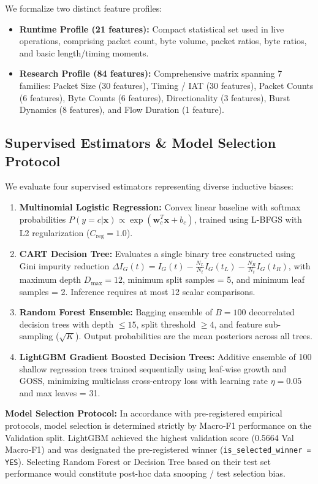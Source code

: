\documentclass[conference]{IEEEtran}
\begin{document}
We formalize two distinct feature profiles:
\begin{itemize}
    \item \textbf{Runtime Profile (21 features):} Compact statistical set used in live operations, comprising packet count, byte volume, packet ratios, byte ratios, and basic length/timing moments.
    \item \textbf{Research Profile (84 features):} Comprehensive matrix spanning 7 families: Packet Size (30 features), Timing / IAT (30 features), Packet Counts (6 features), Byte Counts (6 features), Directionality (3 features), Burst Dynamics (8 features), and Flow Duration (1 feature).
\end{itemize}

\subsection{Supervised Estimators \& Model Selection Protocol}
We evaluate four supervised estimators representing diverse inductive biases:
\begin{enumerate}
    \item \textbf{Multinomial Logistic Regression:} Convex linear baseline with softmax probabilities $P(y=c|\mathbf{x}) \propto \exp(\mathbf{w}_c^T \mathbf{x} + b_c)$, trained using L-BFGS with L2 regularization ($C_{\text{reg}} = 1.0$).
    \item \textbf{CART Decision Tree:} Evaluates a single binary tree constructed using Gini impurity reduction $\Delta I_G(t) = I_G(t) - \frac{N_L}{N_t}I_G(t_L) - \frac{N_R}{N_t}I_G(t_R)$, with maximum depth $D_{\text{max}} = 12$, minimum split samples = 5, and minimum leaf samples = 2. Inference requires at most 12 scalar comparisons.
    \item \textbf{Random Forest Ensemble:} Bagging ensemble of $B=100$ decorrelated decision trees with depth $\le 15$, split threshold $\ge 4$, and feature sub-sampling ($\sqrt{K}$). Output probabilities are the mean posteriors across all trees.
    \item \textbf{LightGBM Gradient Boosted Decision Trees:} Additive ensemble of 100 shallow regression trees trained sequentially using leaf-wise growth and GOSS, minimizing multiclass cross-entropy loss with learning rate $\eta = 0.05$ and max leaves = 31.
\end{enumerate}

\textbf{Model Selection Protocol:} In accordance with pre-registered empirical protocols, model selection is determined strictly by Macro-F1 performance on the Validation split. LightGBM achieved the highest validation score (0.5664 Val Macro-F1) and was designated the pre-registered winner (\texttt{is\_selected\_winner = YES}). Selecting Random Forest or Decision Tree based on their test set performance would constitute post-hoc data snooping / test selection bias.
\end{document}
